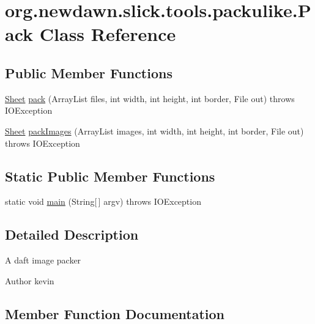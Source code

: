 \hypertarget{classorg_1_1newdawn_1_1slick_1_1tools_1_1packulike_1_1_pack}{}\section{org.\+newdawn.\+slick.\+tools.\+packulike.\+Pack Class Reference}
\label{classorg_1_1newdawn_1_1slick_1_1tools_1_1packulike_1_1_pack}
\subsection*{Public Member Functions}
\begin{DoxyCompactItemize}
\item 
\mbox{\hyperlink{classorg_1_1newdawn_1_1slick_1_1tools_1_1packulike_1_1_sheet}{Sheet}} \mbox{\hyperlink{classorg_1_1newdawn_1_1slick_1_1tools_1_1packulike_1_1_pack_a9c82c8b100ebd308e42424b1dced8213}{pack}} (Array\+List files, int width, int height, int border, File out)  throws I\+O\+Exception 
\item 
\mbox{\hyperlink{classorg_1_1newdawn_1_1slick_1_1tools_1_1packulike_1_1_sheet}{Sheet}} \mbox{\hyperlink{classorg_1_1newdawn_1_1slick_1_1tools_1_1packulike_1_1_pack_a303621f1e4590a9898ccbac6daa6c112}{pack\+Images}} (Array\+List images, int width, int height, int border, File out)  throws I\+O\+Exception 
\end{DoxyCompactItemize}
\subsection*{Static Public Member Functions}
\begin{DoxyCompactItemize}
\item 
static void \mbox{\hyperlink{classorg_1_1newdawn_1_1slick_1_1tools_1_1packulike_1_1_pack_a13cb6a44408e07c044c05a75e783caf0}{main}} (String\mbox{[}$\,$\mbox{]} argv)  throws I\+O\+Exception 
\end{DoxyCompactItemize}


\subsection{Detailed Description}
A daft image packer

\begin{DoxyAuthor}{Author}
kevin 
\end{DoxyAuthor}


\subsection{Member Function Documentation}
\mbox{\label{classorg_1_1newdawn_1_1slick_1_1tools_1_1packulike_1_1_pack_a13cb6a44408e07c044c05a75e783caf0}} 

